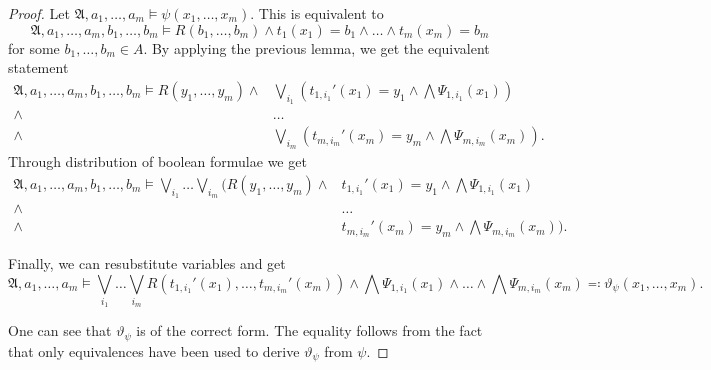 \documentclass[a4paper,11pt,DIV=15]{scrartcl} %
\theoremstyle{plain}
\theoremstyle{definition}
\renewcommand{\theta}{\vartheta}
\begin{document}
\begin{proof}
	Let $\mathfrak A,a_1,\dots,a_m\models\psi(x_1,\dots,x_m)$.
	This is equivalent to 
	$$\mathfrak A,a_1,\dots,a_m,b_1,\dots,b_m\models R(b_1,\dots,b_m)\land t_1(x_1)=b_1\land\dots\land t_m(x_m)=b_m$$
	for some $b_1,\dots,b_m\in A$.
	By applying the previous lemma, we get the equivalent statement
	\begin{align*}
		\mathfrak A,a_1,\dots,a_m,b_1,\dots,b_m\models R(y_1,\dots,y_m) \land& \bigvee_{i_1}\left(t_{1,i_1}'(x_1)=y_1\land \bigwedge\Psi_{1,i_1}(x_1)\right) \\
		\land& \dots \\
		\land& \bigvee_{i_m}\left(t_{m,i_m}'(x_m)=y_m\land \bigwedge\Psi_{m,i_m}(x_m)\right).
	\end{align*}
	Through distribution of boolean formulae we get
	\begin{align}
		\mathfrak A,a_1,\dots,a_m,b_1,\dots,b_m\models \bigvee_{i_1} \dots \bigvee_{i_m} ( R(y_1,\dots,y_m)\land & t_{1,i_1}'(x_1)=y_1 \land \bigwedge\Psi_{1,i_1}(x_1) \nonumber \\
		\land & \dots \label{EquivalentDistributedAtomic}\\
		\land & t_{m,i_m}'(x_m)=y_m \land \bigwedge\Psi_{m,i_m}(x_m) ). \nonumber
	\end{align}
	
	Finally, we can resubstitute variables and get
	$$\mathfrak A,a_1,\dots,a_m\models \bigvee_{i_1}\dots\bigvee_{i_m} R(t_{1,i_1}'(x_1),\dots,t_{m,i_m}'(x_m))\land \bigwedge\Psi_{1,i_1}(x_1)\land\dots\land\bigwedge\Psi_{m,i_m}(x_m)\eqqcolon \theta_\psi(x_1,\dots,x_m).$$
	
	One can see that $\theta_\psi$ is of the correct form.
	The equality follows from the fact that only equivalences have been used to derive $\theta_\psi$ from $\psi$.
	

\end{proof}
\end{document}
